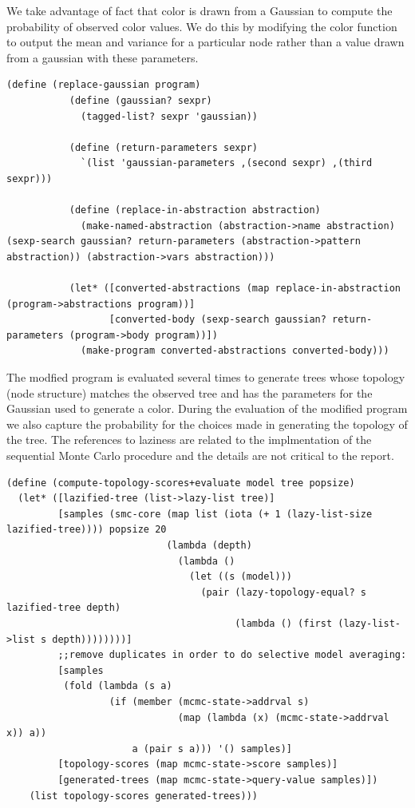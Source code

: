 \documentclass[a4paper,10pt]{article}
\begin{document}
We take advantage of fact that color is drawn from a Gaussian to compute the probability of observed color values.  We do this by modifying the color function to output the mean and variance for a particular node rather than a value drawn from a gaussian with these parameters.
\begin{lstlisting}[frame=trBL]
(define (replace-gaussian program)
           (define (gaussian? sexpr)
             (tagged-list? sexpr 'gaussian))

           (define (return-parameters sexpr)
             `(list 'gaussian-parameters ,(second sexpr) ,(third sexpr)))

           (define (replace-in-abstraction abstraction)
             (make-named-abstraction (abstraction->name abstraction) (sexp-search gaussian? return-parameters (abstraction->pattern abstraction)) (abstraction->vars abstraction)))

           (let* ([converted-abstractions (map replace-in-abstraction (program->abstractions program))]
                  [converted-body (sexp-search gaussian? return-parameters (program->body program))])
             (make-program converted-abstractions converted-body)))
\end{lstlisting}
The modfied program is evaluated several times to generate trees whose topology (node structure) matches the observed tree and has the parameters for the Gaussian used to generate a color.  During the evaluation of the modified program we also capture the probability for the choices made in generating the topology of the tree.  The references to laziness are related to the implmentation of the sequential Monte Carlo procedure and the details are not critical to the report.
\begin{lstlisting}[frame=trBL]
(define (compute-topology-scores+evaluate model tree popsize)
  (let* ([lazified-tree (list->lazy-list tree)]
         [samples (smc-core (map list (iota (+ 1 (lazy-list-size  lazified-tree)))) popsize 20
                            (lambda (depth)
                              (lambda ()
                                (let ((s (model)))
                                  (pair (lazy-topology-equal? s lazified-tree depth)
                                        (lambda () (first (lazy-list->list s depth))))))))]
         ;;remove duplicates in order to do selective model averaging:
         [samples
          (fold (lambda (s a)
                  (if (member (mcmc-state->addrval s)
                              (map (lambda (x) (mcmc-state->addrval x)) a))
                      a (pair s a))) '() samples)]
         [topology-scores (map mcmc-state->score samples)]
         [generated-trees (map mcmc-state->query-value samples)])
    (list topology-scores generated-trees)))
\end{lstlisting}
\end{document}
